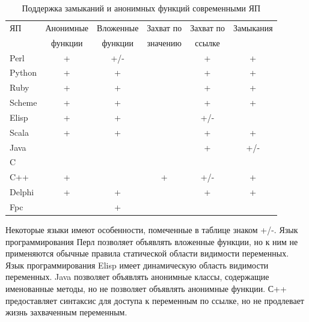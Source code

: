 \documentclass{imcs}
\begin{document}
\begin{table}[h!]
\begin{center}
\begin{tabular}{|l|c|c|c|c|c|}
\hline
  ЯП     &  Анонимные  &  Вложенные  &  Захват по  &  Захват по  &  Замыкания  \\
         &  функции    &  функции    &  значению   &  ссылке     &             \\
\hline
 Perl    &  +          &  +/-        &             &  +          &  +          \\
\hline
 Python  &  +          &  +          &             &  +          &  +          \\
\hline
 Ruby    &  +          &  +          &             &  +          &  +          \\
\hline
 Scheme  &  +          &  +          &             &  +          &  +          \\
\hline
 Elisp   &  +          &  +          &             &  +/-        &             \\
\hline
 Scala   &  +          &  +          &             &  +          &  +          \\
\hline
 Java    &             &             &             &  +          &  +/-        \\
\hline
 C       &             &             &             &             &             \\
\hline
 C++     &  +          &             &  +          &  +/-        &  +          \\
\hline
 Delphi  &  +          &  +          &             &  +          &  +          \\
\hline
 Fpc     &             &  +          &             &             &             \\
\hline
\end{tabular}
\caption{Поддержка замыканий и анонимных функций современными ЯП}\label{tab:wsi_diff_rel}
\end{center}
\end{table}


Некоторые языки имеют особенности, помеченные в таблице знаком +/-.
Язык программирования Перл позволяет объявлять вложенные функции, но к ним не применяются обычные правила
статической области видимости переменных. Язык программирования Elisp имеет динамическую область 
видимости переменных. Java позволяет объявлять анонимные классы, содержащие именованные методы, но не 
позволяет объявлять анонимные функции. С++ предоставляет синтаксис для доступа к переменным по ссылке,
но не продлевает жизнь захваченным переменным.
\end{document}
